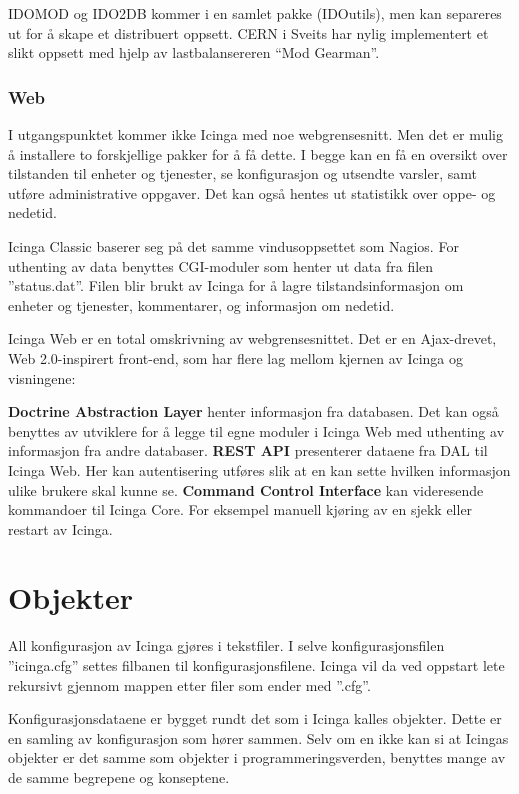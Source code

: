 IDOMOD og IDO2DB kommer i en samlet pakke (IDOutils), men kan separeres ut for å skape et distribuert oppsett. CERN i Sveits har nylig implementert et slikt oppsett med hjelp av lastbalansereren ``Mod Gearman''\cite{cernthesis}.

\subsubsection{Web}\label{sec:teoriweb}
I utgangspunktet kommer ikke Icinga med noe webgrensesnitt. Men det er mulig å installere to forskjellige pakker for å få dette. I begge kan en få en oversikt over tilstanden til enheter og tjenester, se konfigurasjon og utsendte varsler, samt utføre administrative oppgaver. Det kan også hentes ut statistikk over oppe- og nedetid.

Icinga Classic baserer seg på det samme vindusoppsettet som Nagios. For uthenting av data benyttes CGI-moduler som henter ut data fra filen ''status.dat''. Filen blir brukt av Icinga for å lagre tilstandsinformasjon om enheter og tjenester, kommentarer, og informasjon om nedetid. 

Icinga Web er en total omskrivning av webgrensesnittet. Det er en Ajax-drevet, Web 2.0-inspirert front-end, som har flere lag mellom kjernen av Icinga og visningene:

\textbf{Doctrine Abstraction Layer} henter informasjon fra databasen. Det kan også benyttes av utviklere for å legge til egne moduler i Icinga Web med uthenting av informasjon fra andre databaser.
\textbf{REST API} presenterer dataene fra DAL til Icinga Web. Her kan autentisering utføres slik at en kan sette hvilken informasjon ulike brukere skal kunne se.
\textbf{Command Control Interface} kan videresende kommandoer til Icinga Core. For eksempel manuell kjøring av en sjekk eller restart av Icinga. 

\section{Objekter}\label{sec:objekter}
All konfigurasjon av Icinga gjøres i tekstfiler. I selve konfigurasjonsfilen ''icinga.cfg'' settes filbanen til konfigurasjonsfilene. Icinga vil da ved oppstart lete rekursivt gjennom mappen etter filer som ender med ''.cfg''.

Konfigurasjonsdataene er bygget rundt det som i Icinga kalles objekter. Dette er en samling av konfigurasjon som hører sammen. Selv om en ikke kan si at Icingas objekter er det samme som objekter i programmeringsverden, benyttes mange av de samme begrepene og konseptene.


